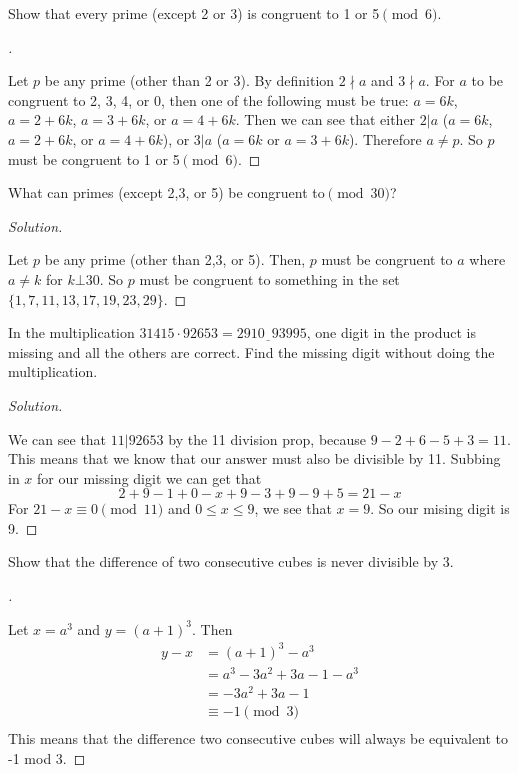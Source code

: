 \documentclass[11pt]{article}
\newcommand{\ndiv}{\nmid}
\newenvironment{myproof}[1][\proofname]{%
  \begin{proof}[#1]$ $\par\nobreak\ignorespaces
}{%
  \end{proof}
}
\newenvironment{problem}[2][Problem]{\begin{trivlist}
\item[\hskip \labelsep {\bfseries #1}\hskip \labelsep {\bfseries #2.}]}{\end{trivlist}}
\newenvironment{solution}
  {\renewcommand\qedsymbol{$~$}\begin{proof}[Solution]$ $\par\nobreak\ignorespaces}
  {\end{proof}}
\begin{document}
\begin{problem}{9}
Show that every prime (except 2 or 3) is congruent to 1 or 5$\pmod{6}$.
\end{problem}

\begin{myproof}
  Let $p$ be any prime (other than 2 or 3). By definition $2\ndiv a$ and $3\ndiv a$. For $a$ to be congruent to 2, 3, 4, or 0, then one of the following must be true: $a=6k$, $a=2 +6k$, $a=3 +6k$, or $a=4 +6k$.
  Then we can see that either $2|a$ ($a=6k$, $a=2+6k$, or $a=4+6k$), or $3|a$ ($a=6k$ or $a=3+6k$). Therefore $a\neq p$. So $p$ must be congruent to 1 or 5$\pmod{6}$.
\end{myproof}



\begin{problem}{10}
What can primes (except 2,3, or 5) be congruent to$\pmod{30}$?
\end{problem}

\begin{solution}
  Let $p$ be any prime (other than 2,3, or 5). Then, $p$ must be congruent to $a$ where $a\neq k$ for $k\bot 30$. So $p$ must be congruent to something in the set $\{1, 7, 11, 13, 17, 19, 23, 29\}$.
\end{solution}


\begin{problem}{11}
In the multiplication $31415\cdot92653=2910\underline{\phantom{3}}93995$, one digit in the product is missing and all the others are correct. Find the missing digit without doing the multiplication.
\end{problem}

\begin{solution}
  We can see that $11|92653$ by the 11 division prop, because $9-2+6-5+3=11$. This means that we know that our answer must also be divisible by 11.
  Subbing in $x$ for our missing digit we can get that
  \[
    2+9-1+0-x+9-3+9-9+5 = 21-x
  \]
  For $21-x\equiv 0 \pmod{11}$ and $0\leq x\leq 9$, we see that $x=9$.
  So our mising digit is 9.
\end{solution}


\begin{problem}{14}
Show that the difference of two consecutive cubes is never divisible by 3.
\end{problem}

\begin{myproof}
  Let $x=a^3$ and $y=(a+1)^3$. Then
  \begin{align*}
    y - x & = (a+1)^3 - a^3           \\
          & = a^3 - 3a^2 + 3a -1 -a^3 \\
          & = - 3a^2 + 3a -1          \\
          & \equiv - 1 \pmod{3}       \\
  \end{align*}
  This means that the difference two consecutive cubes will always be equivalent to -1 mod 3.
\end{myproof}
\end{document}
